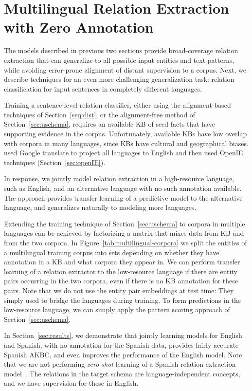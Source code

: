 \section{Multilingual Relation Extraction with Zero Annotation}

\label{sec:multilingual}

The models described in previous two sections provide broad-coverage relation extraction that can generalize to all possible input entities and text patterns, while avoiding error-prone alignment of distant supervision to a corpus. Next, we describe techniques for an even more challenging generalization task: relation classification for input sentences in completely different languages. 


Training a sentence-level relation classifier, either using the alignment-based techniques of Section~\ref{seq:dist}, or the alignment-free method of Section~\ref{sec:uschema}, requires an available KB of seed facts that have supporting evidence in the corpus.  Unfortunately, available KBs have low overlap with corpora in many languages, since KBs have cultural and geographical biases. \citet{faruqui2015multilingual} used Google translate to project all languages to English and then used OpenIE techniques (Section~\ref{sec:openIE}).

In response, we jointly model relation extraction in a high-resource language, such as English, and an alternative language with no such annotation available. The approach provides transfer learning of a predictive model to the alternative language, and generalizes naturally to modeling more languages. 


Extending the training technique of Section~\ref{sec:uschema} to corpora in multiple languages can be achieved by factorizing a matrix that mixes data from KB and from the two corpora. In Figure~\ref{tab:multilingual-corpora} we split the entities of a multilingual training corpus into sets depending on whether they have annotation in a KB and what corpora they appear in. We can perform transfer learning of a relation extractor to the low-resource language if there are entity pairs occurring in the two corpora, even if there is no KB annotation for these pairs. Note that we do not use the entity pair embeddings at test time: They simply used to bridge the languages during training. To form predictions in the low-resource language, we can simply apply the pattern scoring approach of Section~\ref{sec:uschema}. 

In Section~\ref{sec:results}, we demonstrate that jointly learning models for English and Spanish, with no annotation for the Spanish data, provides fairly accurate Spanish AKBC, and even improves the performance of the English model. Note that we are not performing \textit{zero-shot} learning of a Spanish relation extraction model~\citep{zeroshot}. The relations in the target schema are language-independent concepts, and we have supervision for these in English. 

